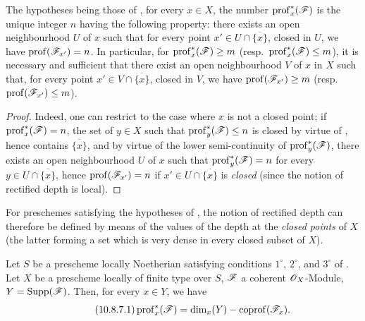 \begin{corollary}[10.8.6]
\label{IV.10.8.6}
The hypotheses being those of , for every $x\in X$, the number $\operatorname{prof}^*_x(\mathscr{F})$ is the unique integer $n$ having the following property: there exists an open neighbourhood $U$ of $x$ such that for every point $x'\in U\cap\overline{\{x\}}$, closed \textup{in} $U$, we have $\operatorname{prof}(\mathscr{F}_{x'})=n$.
In particular, for $\operatorname{prof}^*_x(\mathscr{F})\geq m$ \textup{(resp.\ }$\operatorname{prof}^*_x(\mathscr{F})\leq m$\textup{)}, it is necessary and sufficient that there exist an open neighbourhood $V$ of $x$ in $X$ such that, for every point $x'\in V\cap\overline{\{x\}}$, closed \textup{in} $V$, we have $\operatorname{prof}(\mathscr{F}_{x'})\geq m$ \textup{(resp.\ }$\operatorname{prof}(\mathscr{F}_{x'})\leq m$\textup{)}.
\end{corollary}

\begin{proof}
Indeed, one can restrict to the case where $x$ is not a closed point; if $\operatorname{prof}^*_x(\mathscr{F})=n$, the set of $y\in X$ such that $\operatorname{prof}^*_y(\mathscr{F})\leq n$ is closed by virtue of , hence contains $\overline{\{x\}}$, and by virtue of the lower semi-continuity of $\operatorname{prof}^*_y(\mathscr{F})$, there exists an open neighbourhood $U$ of $x$ such that $\operatorname{prof}^*_y(\mathscr{F})=n$ for every $y\in U\cap\overline{\{x\}}$, hence $\operatorname{prof}(\mathscr{F}_{x'})=n$ if $x'\in U\cap\overline{\{x\}}$ is \emph{closed} (since the notion of rectified depth is local).
\end{proof}

For preschemes satisfying the hypotheses of , the notion of rectified depth can therefore be defined by means of the values of the depth at the \emph{closed points} of $X$ (the latter forming a set which is very dense in every closed subset of $X$).

\begin{proposition}[10.8.7]
\label{IV.10.8.7}
Let $S$ be a prescheme locally Noetherian satisfying conditions $1^\circ$, $2^\circ$, and $3^\circ$ of .
Let $X$ be a prescheme locally of finite type over $S$, $\mathscr{F}$ a coherent $\mathscr{O}_X$-Module, $Y=\operatorname{Supp}(\mathscr{F})$.
Then, for every $x\in Y$, we have
\begin{equation}
\label{IV.10.8.7.1}
\tag{10.8.7.1}
\operatorname{prof}^*_x(\mathscr{F})=\dim_x(Y)-\operatorname{coprof}(\mathscr{F}_x).
\end{equation}
\end{proposition}

